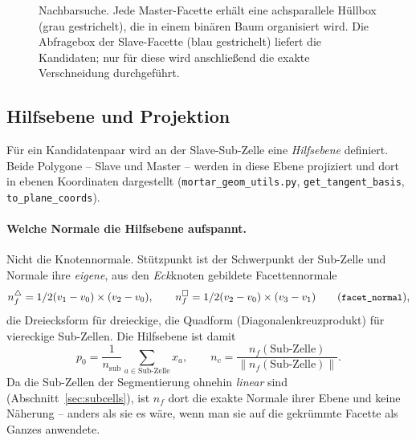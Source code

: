 \documentclass[a4paper,11pt]{article}
\def\bm#1{#1}%
\def\tfrac#1#2{#1/#2}%
\newcommand{\code}[1]{\texttt{\small #1}}
\newcommand{\file}[1]{\texttt{\small #1}}
\begin{document}
\begin{figure}[htbp]
\centering
{}
\caption[Nachbarsuche mit achsparallelen Hüllboxen]{Nachbarsuche. Jede Master-Facette erhält eine
achsparallele Hüllbox (grau gestrichelt), die in einem binären Baum organisiert wird. Die
Abfragebox der Slave-Facette (blau gestrichelt) liefert die Kandidaten; nur für diese wird
anschließend die exakte Verschneidung durchgeführt.}
\label{fig:bvh}
\end{figure}

\subsection{Hilfsebene und Projektion}
\label{sec:hilfsebene}
Für ein Kandidatenpaar wird an der Slave-Sub-Zelle eine \emph{Hilfsebene} definiert. Beide
Polygone -- Slave und Master -- werden in diese Ebene projiziert und dort in ebenen Koordinaten
dargestellt (\file{mortar\_geom\_utils.py}, \code{get\_tangent\_basis}, \code{to\_plane\_coords}).

\paragraph{Welche Normale die Hilfsebene aufspannt.} Nicht die Knotennormale. Stützpunkt ist der
Schwerpunkt der Sub-Zelle und Normale ihre \emph{eigene}, aus den \emph{Eck}knoten gebildete
Facettennormale
\begin{equation}
\bm n_f^{\triangle} = \tfrac12(\bm v_1-\bm v_0)\times(\bm v_2-\bm v_0),
\qquad
\bm n_f^{\square} = \tfrac12(\bm v_2-\bm v_0)\times(\bm v_3-\bm v_1)
\qquad (\code{facet\_normal}),
\label{eq:facetnormal}
\end{equation}
die Dreiecksform für dreieckige, die Quadform (Diagonalenkreuzprodukt) für viereckige Sub-Zellen.
Die Hilfsebene ist damit
\begin{equation}
\bm p_0 = \frac{1}{n_{\text{sub}}}\sum_{a\in\text{Sub-Zelle}}\bm x_a,
\qquad
\bm n_c = \frac{\bm n_f(\text{Sub-Zelle})}{\|\bm n_f(\text{Sub-Zelle})\|} .
\label{eq:auxplane}
\end{equation}
Da die Sub-Zellen der Segmentierung ohnehin \emph{linear} sind
(Abschnitt~\ref{sec:subcells}), ist $\bm n_f$ dort die exakte Normale ihrer Ebene und keine
Näherung -- anders als sie es wäre, wenn man sie auf die gekrümmte Facette als Ganzes anwendete.
\end{document}
